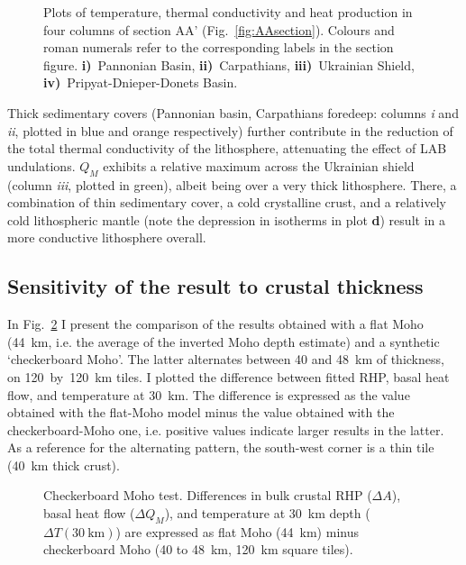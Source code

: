 \begin{figure}
	\begin{adjustbox}{center}
	\end{adjustbox}
	\caption[Plots of temperature, thermal conductivity and heat production in four columns of section AA'.]{Plots of temperature, thermal conductivity and heat production in four columns of section AA' (Fig.~\ref{fig:AAsection}). Colours and roman numerals refer to the corresponding labels in the section figure.
	\textbf{i)}~Pannonian Basin, 
	\textbf{ii)}~Carpathians, 
	\textbf{iii)}~Ukrainian Shield, 
	\textbf{iv)}~Pripyat-Dnieper-Donets Basin.}
	\label{fig:AAsectionCols}
\end{figure}

Thick sedimentary covers (Pannonian basin, Carpathians foredeep: columns \textit{i} and \textit{ii}, plotted in blue and orange respectively) further contribute in the reduction of the total thermal conductivity of the lithosphere, attenuating the effect of LAB undulations.
$Q_M$ exhibits a relative maximum across the Ukrainian shield (column \textit{iii}, plotted in green), albeit being over a very thick lithosphere.
There, a combination of thin sedimentary cover, a cold crystalline crust, and a relatively cold lithospheric mantle (note the depression in isotherms in plot \textbf{d}) result in a more conductive lithosphere overall.

\subsection{Sensitivity of the result to crustal thickness}
\label{ss:Appl:DiscTherm:Sens}

In Fig.~\ref{fig:CompCheckMoho} I present the comparison of the results obtained with a flat Moho (44~\si{\kilo \metre}, i.e. the average of the inverted Moho depth estimate) and a synthetic `checkerboard Moho'.
The latter alternates between \num{40} and \SI{48}{\kilo \metre} of thickness, on \num{120}~by~\SI{120}{\kilo \metre} tiles.
I plotted the difference between fitted RHP, basal heat flow, and temperature at \SI{30}{\kilo \metre}.
The difference is expressed as the value obtained with the flat-Moho model minus the value obtained with the checkerboard-Moho one, i.e. positive values indicate larger results in the latter.
As a reference for the alternating pattern, the south-west corner is a thin tile (\SI{40}{\kilo \metre} thick crust).

\begin{figure}
	\begin{adjustbox}{center}
	\end{adjustbox}
	\caption[Checkerboard Moho test.]{Checkerboard Moho test. Differences in bulk crustal RHP ($\Delta A$), basal heat flow ($\Delta Q_M$), and temperature at \SI{30}{\kilo \metre} depth ($\Delta T(\SI{30}{\kilo \metre})$) are expressed as flat Moho (\SI{44}{\kilo \metre}) minus checkerboard Moho (\num{40} to \SI{48}{\kilo \metre}, \SI{120}{\kilo \metre} square tiles).}
	\label{fig:CompCheckMoho}
\end{figure}

